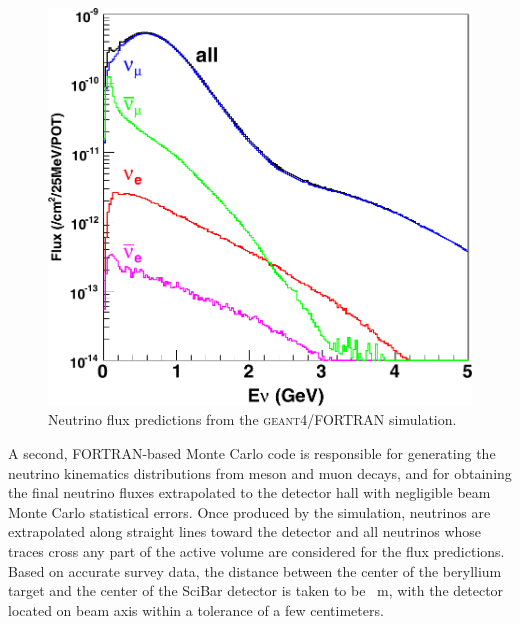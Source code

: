 \begin{figure}
  \centering
  \includegraphics[scale=0.25]{pics/fluxprediction}
  \caption{Neutrino flux predictions from the \textsc{geant4}/FORTRAN simulation.}
  \label{fig:fluxp}
\end{figure}

A second, FORTRAN-based Monte Carlo code is responsible for generating the neutrino %
kinematics distributions from meson and muon decays, and for obtaining the final neutrino %
fluxes extrapolated to the detector hall with negligible beam Monte Carlo statistical errors. 
Once produced by the simulation, neutrinos are extrapolated along straight lines %
toward the detector and all neutrinos whose traces cross any part of the active volume are %
considered for the flux predictions.
Based on accurate survey data, the distance between the center of the beryllium %
target and the center of the SciBar detector is taken to be ~m, %
with the detector located on beam axis within a tolerance of a few centimeters. 

